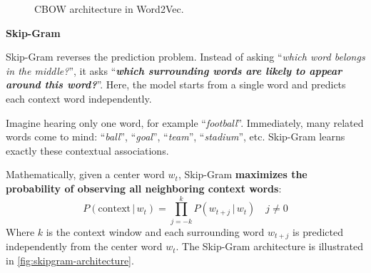\begin{figure}[!htp]
    \caption{CBOW architecture in Word2Vec.\cite{mikolov2013efficient}}
    \label{fig:cbow-architecture}
\end{figure}

\highspace
\begin{flushleft}
    \textcolor{Green3}{ \textbf{Skip-Gram}}
\end{flushleft}
Skip-Gram reverses the prediction problem. Instead of asking ``\emph{which word belongs in the middle?}'', it asks ``\emph{\textbf{which surrounding words are likely to appear around this word?}}''. Here, the model starts from a single word and predicts each context word independently.

\highspace
Imagine hearing only one word, for example ``\emph{football}''. Immediately, many related words come to mind: ``\emph{ball}'', ``\emph{goal}'', ``\emph{team}'', ``\emph{stadium}'', etc. Skip-Gram learns exactly these contextual associations.

\highspace
Mathematically, given a center word $w_t$, Skip-Gram \textbf{maximizes the probability of observing all neighboring context words}:
\begin{equation}
    P\left(\text{context} \, | \, w_{t}\right) = \prod_{j=-k}^{k} P\left(w_{t+j} \, | \, w_{t}\right) \quad j \neq 0
\end{equation}
Where $k$ is the context window and each surrounding word $w_{t+j}$ is predicted independently from the center word $w_t$. The Skip-Gram architecture is illustrated in \autoref{fig:skipgram-architecture}.

